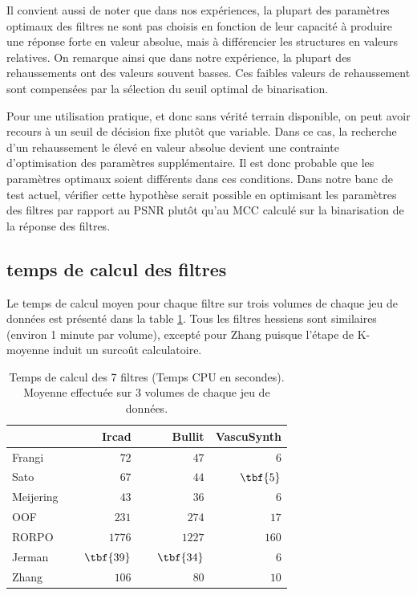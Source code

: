 Il convient aussi de noter que dans nos expériences, la plupart des paramètres optimaux des filtres ne sont pas choisis en fonction de leur capacité à produire une réponse forte en valeur absolue, mais à différencier les structures en valeurs relatives. On remarque ainsi que dans notre expérience, la plupart des rehaussements ont des valeurs souvent basses. Ces faibles valeurs de rehaussement sont compensées par la sélection du seuil optimal de binarisation.

Pour une utilisation pratique, et donc sans vérité terrain disponible, on peut avoir recours à un seuil de décision fixe plutôt que variable. Dans ce cas, la recherche d'un rehaussement le élevé en valeur absolue devient une contrainte d'optimisation des paramètres supplémentaire. Il est donc probable que les paramètres optimaux soient différents dans ces conditions. Dans notre banc de test actuel, vérifier cette hypothèse serait possible en optimisant les paramètres des filtres par rapport au PSNR plutôt qu'au MCC calculé sur la binarisation de la réponse des filtres.

\subsection{temps de calcul des filtres}

Le temps de calcul moyen pour chaque filtre sur trois volumes de chaque jeu de données est présenté dans la table \ref{tab:Computation time benchmark}. Tous les filtres hessiens sont similaires (environ 1 minute par volume), excepté pour Zhang puisque l'étape de K-moyenne induit un surcoût calculatoire.

\begin{table}
  \centering
  \caption{Temps de calcul des 7 filtres (Temps CPU en secondes). Moyenne effectuée sur 3 volumes de chaque jeu de données.}
  \label{tab:Computation time benchmark}
  \begin{tabular}{lrrr}
  \hline
                     & Ircad      & Bullit  & VascuSynth \\
                     \hline
  Frangi    & ~~~~~~~~~$72$  & ~~~~~~~~~$47$   & ~~~~~~~~~$6$   \\
  Sato      & $67$  & $44$   & $\tbf{5}$   \\
  Meijering & $43$  & $36$   & $6$   \\
  OOF       & $231$  & $274$   & $17$   \\
  RORPO     & $1776$  & $1227$   & $160$   \\
  Jerman    & $\tbf{39}$  & $\tbf{34}$   & $6$   \\
  Zhang     & $106$  & $80$   & $10$  \\
  \hline
  \end{tabular}
  \end{table}

